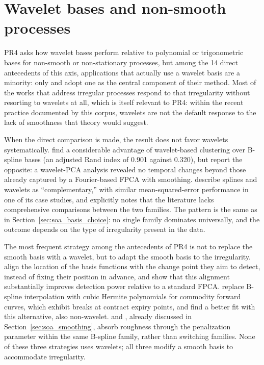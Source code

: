 \section{Wavelet bases and non-smooth processes}
\label{sec:soa_wavelets}

PR4 asks how wavelet bases perform relative to polynomial or
trigonometric bases for non-smooth or non-stationary processes, but
among the 14 direct antecedents of this axis, applications that actually
use a wavelet basis are a minority: only \cite{amato_unsupervised_2025}
and \cite{yang_feature_2022} adopt one as the central component of their
method. Most of the works that address irregular processes respond to
that irregularity without resorting to wavelets at all, which is itself
relevant to PR4: within the recent practice documented by this corpus,
wavelets are not the default response to the lack of smoothness that
theory would suggest.

When the direct comparison is made, the result does not favor wavelets
systematically. \cite{amato_unsupervised_2025} find a considerable
advantage of wavelet-based clustering over B-spline bases (an adjusted
Rand index of 0.901 against 0.320), but \cite{salvatore_exploring_2016}
report the opposite: a wavelet-PCA analysis revealed no temporal changes
beyond those already captured by a Fourier-based FPCA with smoothing.
\cite{eslami_spline_2024} describe splines and wavelets as
``complementary,'' with similar mean-squared-error performance in one of
its case studies, and explicitly notes that the literature lacks
comprehensive comparisons between the two families. The pattern is the
same as in Section~\ref{sec:soa_basis_choice}: no single family
dominates universally, and the outcome depends on the type of
irregularity present in the data.

The most frequent strategy among the antecedents of PR4 is not to
replace the smooth basis with a wavelet, but to adapt the smooth basis
to the irregularity. \cite{jiao_enhanced_2022} align the location of the
basis functions with the change point they aim to detect, instead of
fixing their position in advance, and show that this alignment
substantially improves detection power relative to a standard FPCA.
\cite{horvath_time_2020} replace B-spline interpolation with cubic
Hermite polynomials for commodity forward curves, which exhibit breaks
at contract expiry points, and find a better fit with this alternative,
also non-wavelet. \cite{aguilera_comparative_2013} and
\cite{gao_factor_2024}, already discussed in
Section~\ref{sec:soa_smoothing}, absorb roughness through the
penalization parameter within the same B-spline family, rather than
switching families. None of these three strategies uses wavelets; all
three modify a smooth basis to accommodate irregularity.

